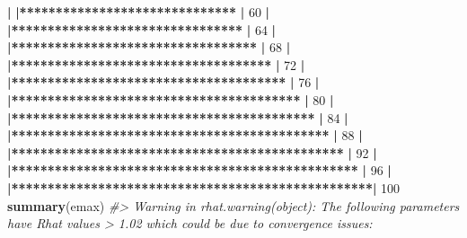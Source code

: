 \documentclass[]{article}
\newenvironment{Shaded}{\begin{snugshade}}{\end{snugshade}}
\newcommand{\CommentTok}[1]{\textcolor[rgb]{0.56,0.35,0.01}{\textit{#1}}}
\newcommand{\DecValTok}[1]{\textcolor[rgb]{0.00,0.00,0.81}{#1}}
\newcommand{\ErrorTok}[1]{\textcolor[rgb]{0.64,0.00,0.00}{\textbf{#1}}}
\newcommand{\KeywordTok}[1]{\textcolor[rgb]{0.13,0.29,0.53}{\textbf{#1}}}
\newcommand{\NormalTok}[1]{#1}
\newcommand{\OperatorTok}[1]{\textcolor[rgb]{0.81,0.36,0.00}{\textbf{#1}}}
\newcommand{\StringTok}[1]{\textcolor[rgb]{0.31,0.60,0.02}{#1}}
\begin{document}
\begin{Shaded}
\begin{Highlighting}[]
{{{{{{{{{{{{{{{{{{{{{{{{{{{{{{{{{{{{{{{{{  \OperatorTok{|}\StringTok{                                                        }
\StringTok{  }\ErrorTok{|******************************}\StringTok{                    }\ErrorTok{|}\StringTok{  }\DecValTok{60}\NormalTok{%
  \OperatorTok{|}\StringTok{                                                        }
\StringTok{  }\ErrorTok{|********************************}\StringTok{                  }\ErrorTok{|}\StringTok{  }\DecValTok{64}\NormalTok{%
  \OperatorTok{|}\StringTok{                                                        }
\StringTok{  }\ErrorTok{|**********************************}\StringTok{                }\ErrorTok{|}\StringTok{  }\DecValTok{68}\NormalTok{%
  \OperatorTok{|}\StringTok{                                                        }
\StringTok{  }\ErrorTok{|************************************}\StringTok{              }\ErrorTok{|}\StringTok{  }\DecValTok{72}\NormalTok{%
  \OperatorTok{|}\StringTok{                                                        }
\StringTok{  }\ErrorTok{|**************************************}\StringTok{            }\ErrorTok{|}\StringTok{  }\DecValTok{76}\NormalTok{%
  \OperatorTok{|}\StringTok{                                                        }
\StringTok{  }\ErrorTok{|****************************************}\StringTok{          }\ErrorTok{|}\StringTok{  }\DecValTok{80}\NormalTok{%
  \OperatorTok{|}\StringTok{                                                        }
\StringTok{  }\ErrorTok{|******************************************}\StringTok{        }\ErrorTok{|}\StringTok{  }\DecValTok{84}\NormalTok{%
  \OperatorTok{|}\StringTok{                                                        }
\StringTok{  }\ErrorTok{|********************************************}\StringTok{      }\ErrorTok{|}\StringTok{  }\DecValTok{88}\NormalTok{%
  \OperatorTok{|}\StringTok{                                                        }
\StringTok{  }\ErrorTok{|**********************************************}\StringTok{    }\ErrorTok{|}\StringTok{  }\DecValTok{92}\NormalTok{%
  \OperatorTok{|}\StringTok{                                                        }
\StringTok{  }\ErrorTok{|************************************************}\StringTok{  }\ErrorTok{|}\StringTok{  }\DecValTok{96}\NormalTok{%
  \OperatorTok{|}\StringTok{                                                        }
\StringTok{  }\ErrorTok{|**************************************************|}\StringTok{ }\DecValTok{100}\NormalTok{%
\KeywordTok{summary}\NormalTok{(emax)}
\CommentTok{#> Warning in rhat.warning(object): The following parameters have Rhat values > 1.02 which could be due to convergence issues:}
}}}}}}}}}}}}}}}}}}}}}}}}}}}}}}}}}}}}}}}}}}}}}}}}}}}}
\end{Highlighting}
\end{Shaded}
\end{document}
